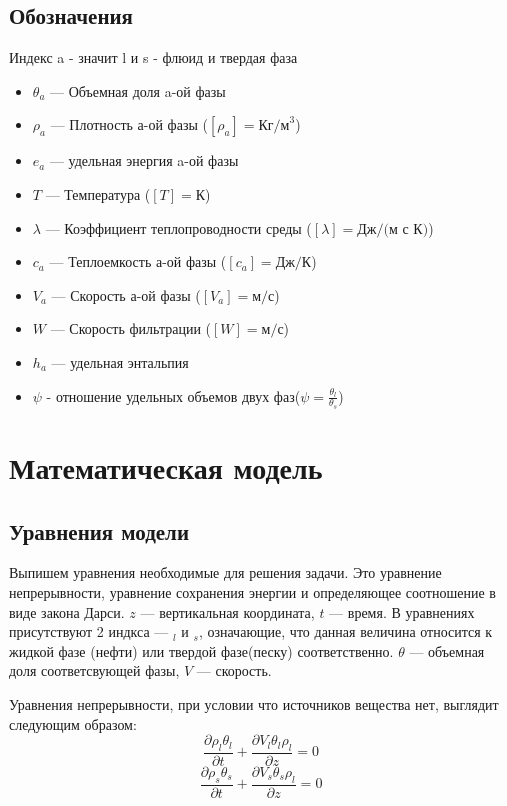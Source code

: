 \documentclass[12pt,a4paper]{article}
\newcommand{\pd}[2]{\frac{\partial #1}{\partial #2}}
\begin{document}
\subsection{Обозначения}
Индекс a - значит l и s - флюид и твердая фаза
\begin{itemize}
\item $\theta_a $ --- Объемная доля a-ой фазы
\item $\rho_a$ --- Плотность а-ой фазы ($[\rho_a] = \text{Кг/м}^3$)
\item $e_a$ --- удельная энергия a-ой фазы
\item $T $ --- Температура ($[T] =\text{К}$)
\item $\lambda$ --- Коэффициент теплопроводности среды ($[\lambda] = \text{Дж/(м с К)}$)
\item $c_a$ --- Теплоемкость а-ой фазы ($[c_a] = \text{Дж/К}$)
\item $V_a$ --- Скорость а-ой фазы ($[V_a] = \text{м/с} $)
\item $W$ --- Скорость фильтрации ($[W] = \text{м/с} $)
\item $h_a$ --- удельная энтальпия
\item $\psi$ - отношение удельных объемов двух фаз($\psi = \frac{\theta_l}{\theta_s} $)
\end{itemize}


\newpage
\section{Математическая модель}
\subsection{Уравнения модели}
Выпишем уравнения необходимые для решения задачи. Это уравнение непрерывности, уравнение сохранения энергии и определяющее соотношение в виде закона Дарси.  $z$ --- вертикальная координата, $t$ --- время. В уравнениях присутствуют 2 индкса --- $ _l $ и $ _s$, означающие, что данная величина относится к жидкой фазе (нефти) или твердой фазе(песку) соответственно. $\theta$ --- объемная доля соответсвующей фазы, $ V $ --- скорость.

Уравнения непрерывности, при условии что источников вещества нет, выглядит следующим образом:
\begin{equation}
\pd{\rho_l\theta_l}{t} + \pd{V_l\theta_l\rho_l}{z} =0
\label{eq:contin_l}
\end{equation}
\begin{equation}
\pd{\rho_s\theta_s}{t} + \pd{V_s\theta_s\rho_l}{z} =0
\label{eq:contin_s}
\end{equation}
\end{document}
